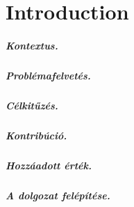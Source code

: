 \setlength{\parindent}{0pt}
\setlength{\parskip}{0.6em}

\chapter{Introduction}
\label{chap:intro}


\paragraph{Kontextus.} 


\paragraph{Problémafelvetés.}


\paragraph{Célkitűzés.}


\paragraph{Kontribúció.}


\paragraph{Hozzáadott érték.}


\paragraph{A dolgozat felépítése.}